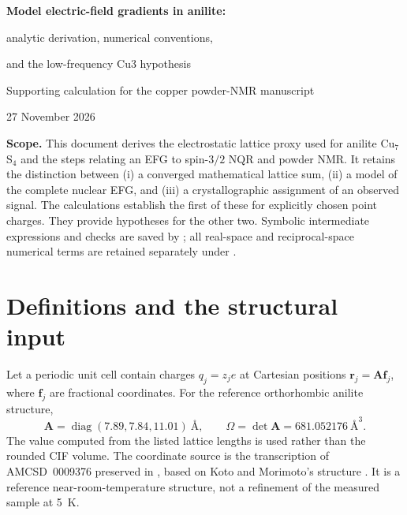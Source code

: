 \documentclass[11pt,a4paper]{article}
\newcommand{\diag}{\operatorname{diag}}
\newcommand{\rvec}{\bm r}
\begin{document}
\begin{center}
{\LARGE\bfseries Model electric-field gradients in anilite:\par}
\vspace{3pt}
{\Large analytic derivation, numerical conventions,\par
and the low-frequency Cu3 hypothesis\par}
\vspace{9pt}
{\small Supporting calculation for the copper powder-NMR manuscript\par
27 November 2026\par}
\end{center}

\noindent\textbf{Scope.} This document derives the electrostatic lattice proxy
used for anilite Cu$_7$S$_4$ and the steps relating an EFG to spin-$3/2$ NQR and
powder NMR. It retains the distinction between (i) a converged mathematical
lattice sum, (ii) a model of the complete nuclear EFG, and (iii) a crystallographic
assignment of an observed signal. The calculations establish the first of these
for explicitly chosen point charges. They provide hypotheses for the other two.
Symbolic intermediate expressions and checks are saved by
; all real-space and reciprocal-space numerical
terms are retained separately under .

\setcounter{tocdepth}{1}
\tableofcontents
\newpage

\section{Definitions and the structural input}

Let a periodic unit cell contain charges $q_j=z_j e$ at Cartesian positions
$\rvec_j=\bm A\bm f_j$, where $\bm f_j$ are fractional coordinates. For the
reference orthorhombic anilite structure,
\begin{equation}
 \bm A=\diag(7.89,7.84,11.01)\ \text{\AA},\qquad
 \Omega=\det\bm A=681.052176\ \text{\AA}^3.
\end{equation}
The value computed from the listed lattice lengths is used rather than the
rounded CIF volume. The coordinate source is the transcription of AMCSD~0009376
preserved in ,
based on Koto and Morimoto's structure \cite{Koto1970}. It is a reference
near-room-temperature structure, not a refinement of the measured sample at 5~K.
\end{document}

